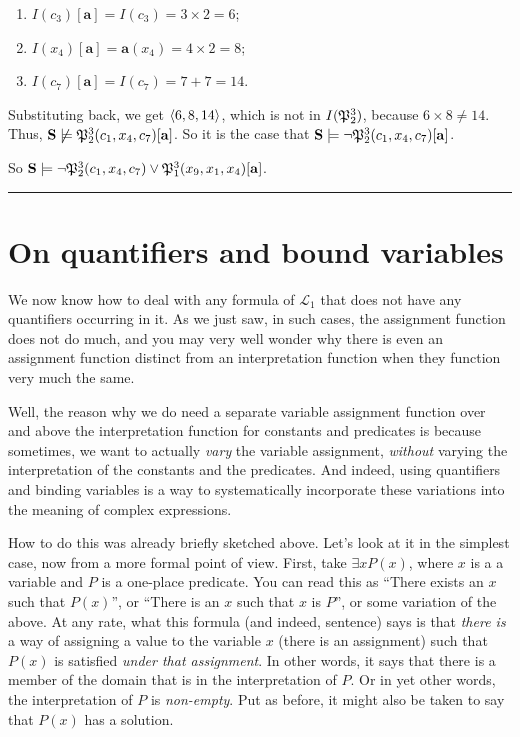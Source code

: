 \begin{remark}
\begin{enumerate}
	\item $I(c_3)[\mathbf{a}]=I(c_3)=3\times 2=6$;
	\item $I(x_4)[\mathbf{a}]=\mathbf{a}(x_4)=4 \times 2=8$;
	\item $I(c_7)[\mathbf{a}]=I(c_7)=7+7=14$.
\end{enumerate}
%
Substituting back, we get $\langle6, 8, 14\rangle$, which is not in $I(\mathfrak{P}^{3}_{2})$, because $6 \times 8 \neq 14$. Thus, $\mathbf{S} \not\models \mathfrak{P}^{3}_{2}(c_1, x_4, c_7)[\mathbf{a}]$. So it is the case that $\mathbf{S} \models \neg \mathfrak{P}^{3}_{2}(c_1, x_4, c_7)[\mathbf{a}]$. 

So $\mathbf{S}\models \neg\mathfrak{P}^{3}_{2}(c_1, x_4, c_7) \vee \mathfrak{P}^{3}_{1}(x_9, x_1, x_4)[\mathbf{a}]$. 
\end{remark}

\hrule\medskip

\section{On quantifiers and bound variables}

We now know how to deal with any formula of $\mathcal{L}_1$ that does not have any quantifiers occurring in it. As we just saw, in such cases, the assignment function does not do much, and you may very well wonder why there is even an assignment function distinct from an interpretation function when they function very much the same. 

Well, the reason why we do need a separate variable assignment function over and above the interpretation function for constants and predicates is because sometimes, we want to actually \textit{vary} the variable assignment, \textit{without} varying the interpretation of the constants and the predicates. And indeed, using quantifiers and binding variables is a way to systematically incorporate these variations into the meaning of complex expressions. 

How to do this was already briefly sketched above. Let's look at it in the simplest case, now from a more formal point of view. First, take $\exists x P(x)$, where $x$ is a a variable and $P$ is a one-place predicate. You can read this as ``There exists an $x$ such that $P(x)$'', or ``There is an $x$ such that $x$ is $P$'', or some variation of the above. At any rate, what this formula (and indeed, sentence) says is that \textit{there is} a way of assigning a value to the variable $x$ (there is an assignment) such that $P(x)$ is satisfied \textit{under that assignment}. In other words, it says that there is a member of the domain that is in the interpretation of $P$. Or in yet other words, the interpretation of $P$ is \textit{non-empty}. Put as before, it might also be taken to say that $P(x)$ has a solution.

